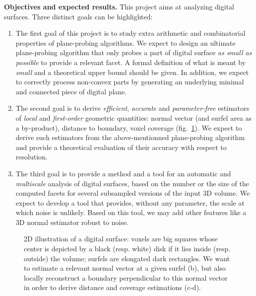 \noindent\textbf{Objectives and expected results.}
This project aims at analyzing digital surfaces. Three distinct goals can be highlighted:
\begin{enumerate}[label=(G\arabic*)]
  \item %
The first goal of this project is to study extra arithmetic and combinatorial properties
of plane-probing algorithms. We expect to design an ultimate plane-probing algorithm that
only probes a part of digital surface \emph{as small as possible} to provide a relevant facet.
A formal definition of what is meant by \emph{small} and a theoretical upper bound should be given.
In addition, we expect to correctly process non-convex parts by generating an underlying
minimal and connected piece of digital plane.  \label{goalppa} 
 \item %
The second goal is to derive \emph{efficient}, \emph{accurate} and \emph{parameter-free} estimators
of \emph{local} and \emph{first-order} geometric quantities: normal vector (and surfel area as a by-product),
distance to boundary, voxel coverage (fig.~\ref{fig:2D}). We expect to derive such estimators from
the above-mentionned plane-probing algorithm and provide a theoretical evaluation of their accuracy
with respect to resolution. \label{goalestim}  
 \item %
The third goal is to provide a method and a tool for an automatic and \emph{multiscale} analysis of digital surfaces,
based on the number or the size of the computed facets for several subsampled versions of the input 3D volume. 
We expect to develop a tool that provides, without any parameter, the scale at which noise is unlikely. Based on
this tool, we may add other features like a 3D normal estimator robust to noise.  \label{goalscale}
\end{enumerate}

\begin{figure}[hbt]
  \centering
{} \hspace{0.05\textwidth}
 \hspace{0.05\textwidth}
 \hspace{0.05\textwidth}
 \caption{2D illustration of a digital surface: voxels are big squares whose center is depicted by a black (resp. white) disk if it lies inside (resp. outside) the volume; surfels are elongated dark rectangles. We want to estimate a relevant normal vector at a given surfel (b), but also locally reconstruct a boundary perpendicular to this normal vector in order to derive distance and coverage estimations (c-d).} 
\label{fig:2D} 
\end{figure}

